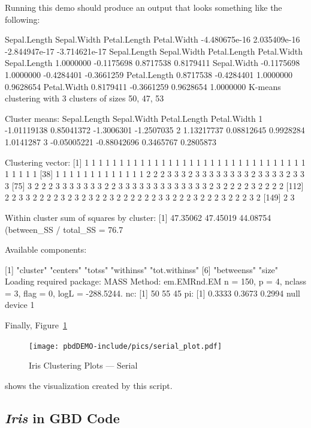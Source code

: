 Running this demo should produce an output that looks something like the
following:
\begin{Output}
 Sepal.Length   Sepal.Width  Petal.Length   Petal.Width 
-4.480675e-16  2.035409e-16 -2.844947e-17 -3.714621e-17 
             Sepal.Length Sepal.Width Petal.Length Petal.Width
Sepal.Length    1.0000000  -0.1175698    0.8717538   0.8179411
Sepal.Width    -0.1175698   1.0000000   -0.4284401  -0.3661259
Petal.Length    0.8717538  -0.4284401    1.0000000   0.9628654
Petal.Width     0.8179411  -0.3661259    0.9628654   1.0000000
K-means clustering with 3 clusters of sizes 50, 47, 53

Cluster means:
  Sepal.Length Sepal.Width Petal.Length Petal.Width
1  -1.01119138  0.85041372   -1.3006301  -1.2507035
2   1.13217737  0.08812645    0.9928284   1.0141287
3  -0.05005221 -0.88042696    0.3465767   0.2805873

Clustering vector:
  [1] 1 1 1 1 1 1 1 1 1 1 1 1 1 1 1 1 1 1 1 1 1 1 1 1 1 1 1 1 1 1 1 1 1 1 1 1 1
 [38] 1 1 1 1 1 1 1 1 1 1 1 1 1 2 2 2 3 3 3 2 3 3 3 3 3 3 3 3 2 3 3 3 3 2 3 3 3
 [75] 3 2 2 2 3 3 3 3 3 3 3 2 2 3 3 3 3 3 3 3 3 3 3 3 3 3 2 3 2 2 2 2 3 2 2 2 2
[112] 2 2 3 3 2 2 2 2 3 2 3 2 3 2 2 3 2 2 2 2 2 2 3 3 2 2 2 3 2 2 2 3 2 2 2 3 2
[149] 2 3

Within cluster sum of squares by cluster:
[1] 47.35062 47.45019 44.08754
 (between_SS / total_SS =  76.7 %

Available components:

[1] "cluster"      "centers"      "totss"        "withinss"     "tot.withinss"
[6] "betweenss"    "size"        
Loading required package: MASS
Method: em.EMRnd.EM
 n = 150, p = 4, nclass = 3, flag = 0, logL = -288.5244.
nc: 
[1] 50 55 45
pi: 
[1] 0.3333 0.3673 0.2994
null device 
          1 
\end{Output}

Finally, Figure~\ref{fig:iris_cluster_serial}
\begin{figure}[h!bt]
  \centering
  \texttt{[image: pbdDEMO-include/pics/serial\_plot.pdf]}
  \caption{Iris Clustering Plots --- Serial}
  \label{fig:iris_cluster_serial}
\end{figure}
shows the visualization created by this script.








\subsection{{\it Iris} in GBD Code}

